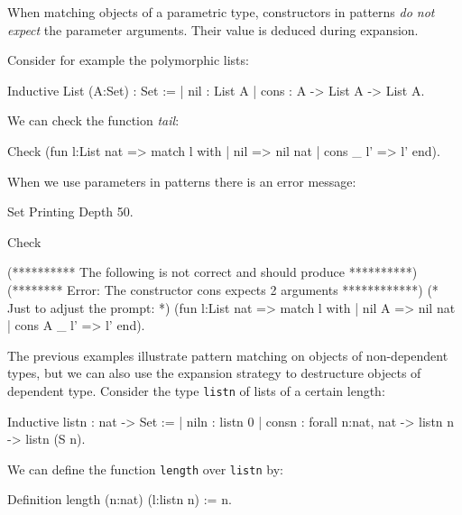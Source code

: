 When matching objects of a parametric type, constructors in patterns
{\em do not expect} the parameter arguments. Their value is deduced
during expansion.

Consider for example the polymorphic lists:

\begin{coq_example}
Inductive List (A:Set) : Set :=
  | nil : List A
  | cons : A -> List A -> List A.
\end{coq_example}

We can check the function {\em tail}:

\begin{coq_example}
Check
  (fun l:List nat =>
     match l with
     | nil => nil nat
     | cons _ l' => l'
     end).
\end{coq_example}


When we use parameters in patterns there is an error message:
\begin{coq_eval}
Set Printing Depth 50.
\end{coq_eval}
\begin{coq_example}
Check
  
  (********** The following is not correct and should produce **********)
  (******** Error: The constructor cons expects 2 arguments ************)
  (* Just to adjust the prompt: *) (fun l:List nat =>
                                      match l with
                                      | nil A => nil nat
                                      | cons A _ l' => l'
                                      end).
\end{coq_example}



The previous examples illustrate pattern matching on objects of
non-dependent types, but we can also 
use the expansion strategy to destructure objects of dependent type.
Consider the type \texttt{listn} of lists of a certain length:

\begin{coq_example}
Inductive listn : nat -> Set :=
  | niln : listn 0%
  | consn : forall n:nat, nat -> listn n -> listn (S n).
\end{coq_example}

We can define the function \texttt{length} over \texttt{listn} by:

\begin{coq_example}
Definition length (n:nat) (l:listn n) := n.
\end{coq_example}

